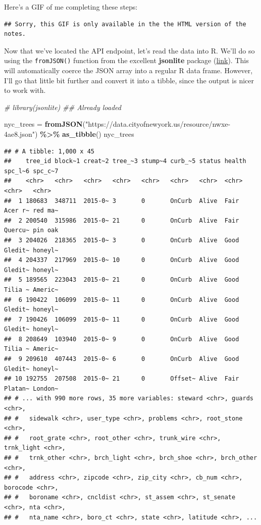 \documentclass[
]{article}
\newenvironment{Shaded}{\begin{snugshade}}{\end{snugshade}}
\newcommand{\CommentTok}[1]{\textcolor[rgb]{0.56,0.35,0.01}{\textit{#1}}}
\newcommand{\FunctionTok}[1]{\textcolor[rgb]{0.13,0.29,0.53}{\textbf{#1}}}
\newcommand{\NormalTok}[1]{#1}
\newcommand{\OtherTok}[1]{\textcolor[rgb]{0.56,0.35,0.01}{#1}}
\newcommand{\SpecialCharTok}[1]{\textcolor[rgb]{0.81,0.36,0.00}{\textbf{#1}}}
\newcommand{\StringTok}[1]{\textcolor[rgb]{0.31,0.60,0.02}{#1}}
\begin{document}
Here's a GIF of me completing these steps:

\begin{verbatim}
## Sorry, this GIF is only available in the the HTML version of the notes.
\end{verbatim}

Now that we've located the API endpoint, let's read the data into R.
We'll do so using the \texttt{fromJSON()} function from the excellent
\textbf{jsonlite} package
(\href{https://cran.r-project.org/web/packages/jsonlite/index.html}{link}).
This will automatically coerce the JSON array into a regular R data
frame. However, I'll go that little bit further and convert it into a
tibble, since the output is nicer to work with.

\begin{Shaded}
\begin{Highlighting}[]
\CommentTok{\# library(jsonlite) \#\# Already loaded}

\NormalTok{nyc\_trees }\OtherTok{=} 
  \FunctionTok{fromJSON}\NormalTok{(}\StringTok{"https://data.cityofnewyork.us/resource/nwxe{-}4ae8.json"}\NormalTok{) }\SpecialCharTok{\%\textgreater{}\%}
  \FunctionTok{as\_tibble}\NormalTok{()}
\NormalTok{nyc\_trees}
\end{Highlighting}
\end{Shaded}

\begin{verbatim}
## # A tibble: 1,000 x 45
##    tree_id block~1 creat~2 tree_~3 stump~4 curb_~5 status health spc_l~6 spc_c~7
##    <chr>   <chr>   <chr>   <chr>   <chr>   <chr>   <chr>  <chr>  <chr>   <chr>  
##  1 180683  348711  2015-0~ 3       0       OnCurb  Alive  Fair   Acer r~ red ma~
##  2 200540  315986  2015-0~ 21      0       OnCurb  Alive  Fair   Quercu~ pin oak
##  3 204026  218365  2015-0~ 3       0       OnCurb  Alive  Good   Gledit~ honeyl~
##  4 204337  217969  2015-0~ 10      0       OnCurb  Alive  Good   Gledit~ honeyl~
##  5 189565  223043  2015-0~ 21      0       OnCurb  Alive  Good   Tilia ~ Americ~
##  6 190422  106099  2015-0~ 11      0       OnCurb  Alive  Good   Gledit~ honeyl~
##  7 190426  106099  2015-0~ 11      0       OnCurb  Alive  Good   Gledit~ honeyl~
##  8 208649  103940  2015-0~ 9       0       OnCurb  Alive  Good   Tilia ~ Americ~
##  9 209610  407443  2015-0~ 6       0       OnCurb  Alive  Good   Gledit~ honeyl~
## 10 192755  207508  2015-0~ 21      0       Offset~ Alive  Fair   Platan~ London~
## # ... with 990 more rows, 35 more variables: steward <chr>, guards <chr>,
## #   sidewalk <chr>, user_type <chr>, problems <chr>, root_stone <chr>,
## #   root_grate <chr>, root_other <chr>, trunk_wire <chr>, trnk_light <chr>,
## #   trnk_other <chr>, brch_light <chr>, brch_shoe <chr>, brch_other <chr>,
## #   address <chr>, zipcode <chr>, zip_city <chr>, cb_num <chr>, borocode <chr>,
## #   boroname <chr>, cncldist <chr>, st_assem <chr>, st_senate <chr>, nta <chr>,
## #   nta_name <chr>, boro_ct <chr>, state <chr>, latitude <chr>, ...
\end{verbatim}
\end{document}
